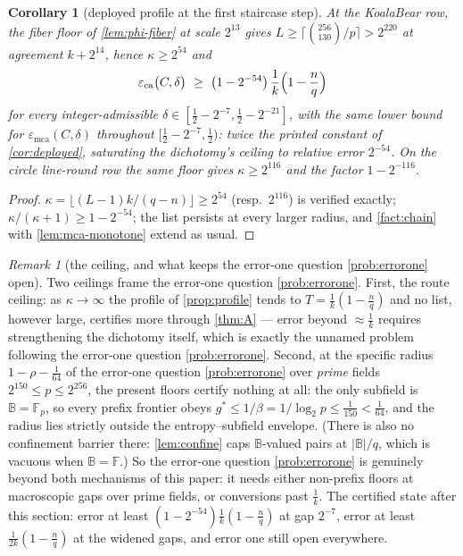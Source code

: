 \documentclass[11pt]{article}
\newtheorem{corollary}[corollary]{Corollary}
\theoremstyle{definition}
\theoremstyle{remark}
\newtheorem{remark}[remark]{Remark}
\newcommand{\F}{\mathbb{F}}
\newcommand{\B}{\mathbb{B}}
\newcommand{\eca}{\varepsilon_{\mathrm{ca}}}
\newcommand{\emca}{\varepsilon_{\mathrm{mca}}}
\begin{document}
\begin{corollary}[deployed profile at the first staircase step]\label{cor:profile-deployed}
At the KoalaBear row, the fiber floor of \cref{lem:phi-fiber} at scale $2^{13}$ gives $L\ge\lceil\binom{256}{130}/p\rceil>2^{220}$ at agreement $k+2^{14}$, hence $\kappa\ge2^{54}$ and
\[
\eca\bigl(C,\delta\bigr)\ \ge\ \bigl(1-2^{-54}\bigr)\,\frac1k\Bigl(1-\frac nq\Bigr)
\]
for every integer-admissible $\delta\in[\frac12-2^{-7},\frac12-2^{-21}]$, with the same lower bound for $\emca(C,\delta)$ throughout $[\frac12-2^{-7},\frac12)$: twice the printed constant of \cref{cor:deployed}, saturating the dichotomy's ceiling to relative error $2^{-54}$. On the circle line-round row the same floor gives $\kappa\ge2^{116}$ and the factor $1-2^{-116}$.
\end{corollary}

\begin{proof}
$\kappa=\lfloor(L-1)k/(q-n)\rfloor\ge2^{54}$ \textup(resp.\ $2^{116}$\textup) is verified exactly; $\kappa/(\kappa+1)\ge1-2^{-54}$; the list persists at every larger radius, and \cref{fact:chain} with \cref{lem:mca-monotone} extend as usual.
\end{proof}

\begin{remark}[the ceiling, and what keeps the error-one question \cref{prob:errorone} open]\label{rem:profile-ceiling}
Two ceilings frame the error-one question \cref{prob:errorone}. First, the route ceiling: as $\kappa\to\infty$ the profile of \cref{prop:profile} tends to $T=\frac1k(1-\frac nq)$ and no list, however large, certifies more through \cref{thm:A} --- error beyond $\approx\frac1k$ requires strengthening the dichotomy itself, which is exactly the unnamed problem following the error-one question \cref{prob:errorone}. Second, at the specific radius $1-\rho-\frac1{64}$ of the error-one question \cref{prob:errorone} over \emph{prime} fields $2^{150}\le p\le2^{256}$, the present floors certify nothing at all: the only subfield is $\B=\F_p$, so every prefix frontier obeys $g^*\le1/\beta=1/\log_2p\le\frac1{150}<\frac1{64}$, and the radius lies strictly outside the entropy--subfield envelope. \textup(There is also no confinement barrier there: \cref{lem:confine} caps $\B$-valued pairs at $|\B|/q$, which is vacuous when $\B=\F$.\textup) So the error-one question \cref{prob:errorone} is genuinely beyond both mechanisms of this paper: it needs either non-prefix floors at macroscopic gaps over prime fields, or conversions past $\frac1k$. The certified state after this section: error at least $(1-2^{-54})\frac1k(1-\frac nq)$ at gap $2^{-7}$, error at least $\frac1{2k}(1-\frac nq)$ at the widened gaps, and error one still open everywhere.
\end{remark}
\end{document}
